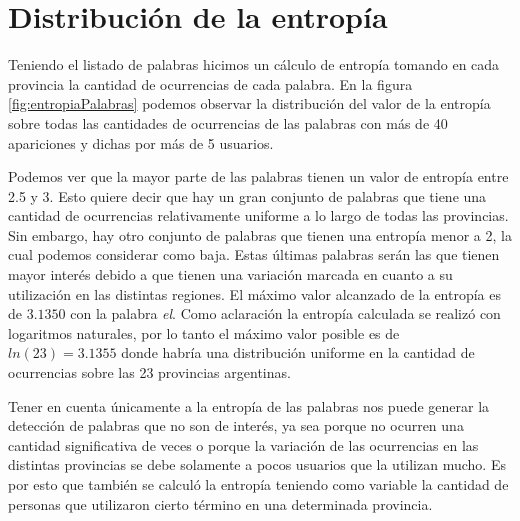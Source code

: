 







\section{Distribución de la entropía}
Teniendo el listado de palabras hicimos un cálculo de entropía tomando en cada provincia la cantidad de ocurrencias de cada palabra. En la figura \ref{fig:entropiaPalabras} podemos observar la distribución del valor de la entropía sobre todas las cantidades de ocurrencias de las palabras con más de 40 apariciones y dichas por más de 5 usuarios. 

Podemos ver que la mayor parte de las palabras tienen un valor de entropía entre 2.5 y 3. Esto quiere decir que hay un gran conjunto de palabras que tiene una cantidad de ocurrencias relativamente uniforme a lo largo de todas las provincias. Sin embargo, hay otro conjunto de palabras que tienen una entropía menor a 2, la cual podemos considerar como baja. Estas últimas palabras serán las que tienen mayor interés debido a que tienen una variación marcada en cuanto a su utilización en las distintas regiones. El máximo valor alcanzado de la entropía es de $3.1350$ con la palabra \textit{el}. Como aclaración la entropía calculada se realizó con logaritmos naturales, por lo tanto el máximo valor posible es de  $ln(23) = 3.1355$ donde habría una distribución uniforme en la cantidad de ocurrencias sobre las 23 provincias argentinas.

Tener en cuenta únicamente a la entropía de las palabras nos puede generar la detección de palabras que no son de interés, ya sea porque no ocurren una cantidad significativa de veces o porque la variación de las ocurrencias en las distintas provincias se debe solamente a pocos usuarios que la utilizan mucho. Es por esto que también se calculó la entropía teniendo como variable la cantidad de personas que utilizaron cierto término en una determinada provincia.


